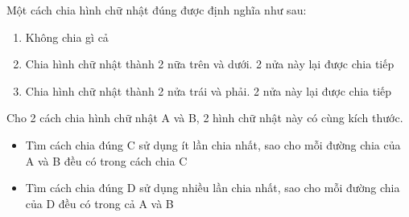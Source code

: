 Một cách chia hình chữ nhật đúng được định nghĩa như sau:
\begin{enumerate}
	\item Không chia gì cả
	\item Chia hình chữ nhật thành 2 nữa trên và dưới. 2 nửa này lại được chia tiếp
	\item Chia hình chữ nhật thành 2 nửa trái và phải. 2 nửa này lại được chia tiếp
\end{enumerate}

Cho 2 cách chia hình chữ nhật A và B, 2 hình chữ nhật này có cùng kích thước.
\begin{itemize}
	\item Tìm cách chia đúng C sử dụng ít lần chia nhất, sao cho mỗi đường chia của A và B đều có trong cách chia C
	\item Tìm cách chia đúng D sử dụng nhiều lần chia nhất, sao cho mỗi đường chia của D đều có trong cả A và B
\end{itemize}